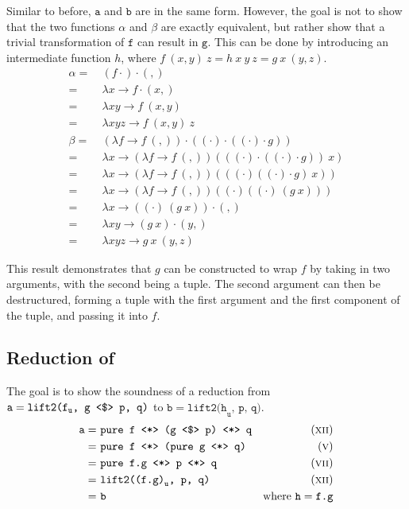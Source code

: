 Similar to before, $\texttt{a}$ and $\texttt{b}$ are in the same form.
However, the goal is not to show that the two functions $\alpha$ and $\beta$ are exactly equivalent, but rather show that a trivial transformation of $\texttt{f}$ can result in $\texttt{g}$.
This can be done by introducing an intermediate function $h$, where $f\ (x, y)\ z = h\ x\ y\ z = g\ x\ (y, z)$.
\begin{align*}
    \alpha =\ & (f \cdot) \cdot (,) \\
    =\ & \lambda x \to f \cdot (x, ) \\
    =\ & \lambda xy \to f\ (x, y) \\
    =\ & \lambda xyz \to f\ (x, y)\ z \\
    \beta =\ & (\lambda f \to f\ (,)) \cdot ((\cdot) \cdot ((\cdot) \cdot g)) \\
    =\ & \lambda x \to (\lambda f \to f\ (,))(((\cdot) \cdot ((\cdot) \cdot g))\ x) \\
    =\ & \lambda x \to (\lambda f \to f\ (,))(((\cdot) ((\cdot) \cdot g)\ x)) \\
    =\ & \lambda x \to (\lambda f \to f\ (,))((\cdot) ((\cdot)\ (g\ x))) \\
    =\ & \lambda x \to ((\cdot)\ (g\ x)) \cdot (,) \\
    =\ & \lambda xy \to (g\ x) \cdot (y,) \\
    =\ & \lambda xyz \to g\ x\ (y, z)
\end{align*}

This result demonstrates that $g$ can be constructed to wrap $f$ by taking in two arguments, with the second being a tuple.
The second argument can then be destructured, forming a tuple with the first argument and the first component of the tuple, and passing it into $f$.

\subsection{Reduction of \texttt{\fmap}}
The goal is to show the soundness of a reduction from $\texttt{a} = \texttt{lift2(f}_\texttt{u}\texttt{, g \fmap p, q)}$ to $\texttt{b} = \texttt{lift2(h}_\texttt{u}\texttt{, p, q)}$.
\begin{align*}
    \texttt{a} =\ & \texttt{pure f \ap (g \fmap p) \ap q} & \equi[12] \\
    =\ & \texttt{pure f \ap (pure g \ap q)} & \equi[5] \\
    =\ & \texttt{pure f.g \ap p \ap q} & \equi[7] \\
    =\ & \texttt{lift2((f.g)}_\texttt{u}\texttt{, p, q)} & \equi[12] \\
    =\ & \texttt{b} & \text{where $\texttt{h} = \texttt{f.g}$}
\end{align*}

